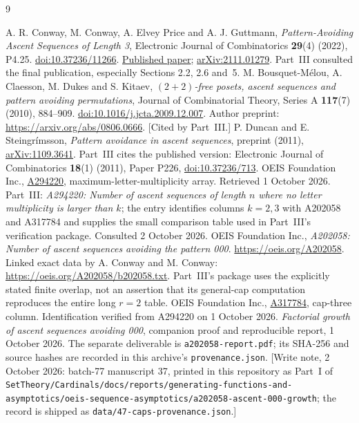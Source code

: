\documentclass[11pt,letterpaper]{article}
\theoremstyle{remark}\newtheorem{remark}[theorem]{Remark}
\newcommand{\repopath}[1]{\nolinkurl{#1}}
\begin{document}
\begingroup\small
\begin{thebibliography}{9}
\raggedright
{} A. R. Conway, M. Conway, A. Elvey Price and A. J. Guttmann,
\emph{Pattern-Avoiding Ascent Sequences of Length 3},
Electronic Journal of Combinatorics \textbf{29}(4) (2022), P4.25.
\href{https://doi.org/10.37236/11266}{doi:10.37236/11266}.
\href{https://www.combinatorics.org/ojs/index.php/eljc/article/download/v29i4p25/pdf/}{Published paper};
\href{https://arxiv.org/abs/2111.01279}{arXiv:2111.01279}.
Part~III consulted the final publication, especially Sections 2.2, 2.6 and~5.
M. Bousquet-M\'elou, A. Claesson, M. Dukes and S. Kitaev,
\emph{$(2+2)$-free posets, ascent sequences and pattern avoiding permutations},
Journal of Combinatorial Theory, Series A \textbf{117}(7) (2010), 884--909.
\href{https://doi.org/10.1016/j.jcta.2009.12.007}{doi:10.1016/j.jcta.2009.12.007}.
Author preprint: \url{https://arxiv.org/abs/0806.0666}. [Cited by Part~III.]
 P. Duncan and E. Steingr\'imsson,
\emph{Pattern avoidance in ascent sequences}, preprint (2011),
\href{https://arxiv.org/abs/1109.3641}{arXiv:1109.3641}.
Part~III cites the published version: Electronic Journal of Combinatorics \textbf{18}(1) (2011), Paper P226, \href{https://doi.org/10.37236/713}{doi:10.37236/713}.
 OEIS Foundation Inc.,
\href{https://oeis.org/A294220}{A294220}, maximum-letter-multiplicity array.
Retrieved 1 October 2026. Part~III: \emph{A294220: Number of ascent sequences of length $n$ where no letter multiplicity is larger than $k$}; the entry identifies columns $k=2,3$ with A202058 and A317784 and supplies the small comparison table used in Part~III's verification package. Consulted 2 October 2026.
 OEIS Foundation Inc.,
\emph{A202058: Number of ascent sequences avoiding the pattern 000}.
\url{https://oeis.org/A202058}.
Linked exact data by A. Conway and M. Conway:
\url{https://oeis.org/A202058/b202058.txt}.
Part~III's package uses the explicitly stated finite overlap, not an assertion that its general-cap computation reproduces the entire long $r=2$ table.
 OEIS Foundation Inc.,
\href{https://oeis.org/A317784}{A317784}, cap-three column.
Identification verified from A294220 on 1 October 2026.
 \emph{Factorial growth of ascent sequences avoiding 000},
companion proof and reproducible report, 1 October 2026.
The separate deliverable is \texttt{a202058-report.pdf}; its SHA-256 and source hashes
are recorded in this archive's \texttt{provenance.json}.
[Write note, 2 October 2026: batch-77 manuscript 37, printed in this repository as Part~I of \repopath{SetTheory/Cardinals/docs/reports/generating-functions-and-asymptotics/oeis-sequence-asymptotics/a202058-ascent-000-growth}; the record is shipped as \repopath{data/47-caps-provenance.json}.]

\end{thebibliography}
\end{document}
